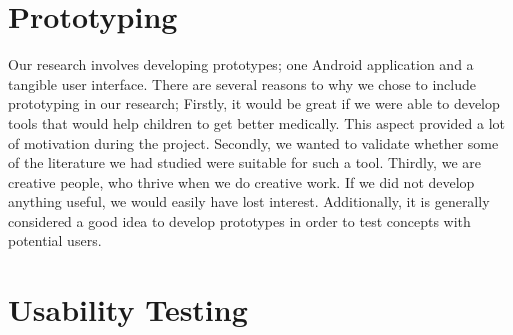\section{Prototyping}
\label{sec:researchmethodprototyping}
Our research involves developing prototypes; one Android application and a tangible user interface. There are several reasons to why we chose to include prototyping in our research; Firstly, it would be great if we were able to develop tools that would help children to get better medically. This aspect provided a lot of motivation during the project. Secondly, we wanted to validate whether some of the literature we had studied were suitable for such a tool. Thirdly, we are creative people, who thrive when we do creative work. If we did not develop anything useful, we would easily have lost interest. Additionally, it is generally considered a good idea to develop prototypes in order to test concepts with potential users\cite{dumas1995practical}.
      
\section{Usability Testing}
\label{sec:usabilitytesting}
 